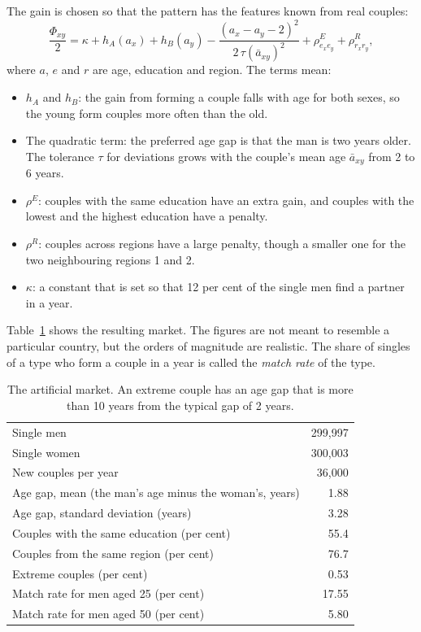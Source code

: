 \documentclass[12pt,a4paper]{article}
\begin{document}
The gain is chosen so that the pattern has the features known from real couples:
\[
\frac{\Phi_{xy}}{2}=\kappa+h_A(a_x)+h_B(a_y)-\frac{(a_x-a_y-2)^2}{2\,\tau(\bar a_{xy})^2}
+\rho^E_{e_xe_y}+\rho^R_{r_xr_y},
\]
where $a$, $e$ and $r$ are age, education and region. The terms mean:

\begin{itemize}
\item $h_A$ and $h_B$: the gain from forming a couple falls with age for both sexes, so the young
form couples more often than the old.
\item The quadratic term: the preferred age gap is that the man is two years older. The tolerance
$\tau$ for deviations grows with the couple's mean age $\bar a_{xy}$ from 2 to 6 years.
\item $\rho^E$: couples with the same education have an extra gain, and couples with the lowest and
the highest education have a penalty.
\item $\rho^R$: couples across regions have a large penalty, though a smaller one for the two
neighbouring regions 1 and 2.
\item $\kappa$: a constant that is set so that 12 per cent of the single men find a partner in a
year.
\end{itemize}

Table~\ref{tab:marked} shows the resulting market. The figures are not meant to resemble a
particular country, but the orders of magnitude are realistic. The share of singles of a type who
form a couple in a year is called the \emph{match rate} of the type.

\begin{table}[htb]
\centering
\caption{The artificial market. An extreme couple has an age gap that is more than 10 years from
the typical gap of 2 years.}
\label{tab:marked}
\begin{tabular}{@{}lr@{}}
\toprule
Single men & 299,997 \\
Single women & 300,003 \\
New couples per year & 36,000 \\
Age gap, mean (the man's age minus the woman's, years) & 1.88 \\
Age gap, standard deviation (years) & 3.28 \\
Couples with the same education (per cent) & 55.4 \\
Couples from the same region (per cent) & 76.7 \\
Extreme couples (per cent) & 0.53 \\
Match rate for men aged 25 (per cent) & 17.55 \\
Match rate for men aged 50 (per cent) & 5.80 \\
\bottomrule
\end{tabular}
\end{table}
\end{document}
